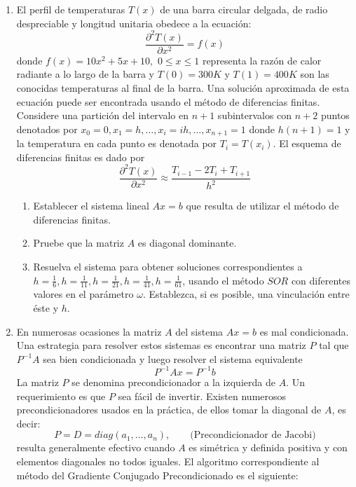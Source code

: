 \documentclass[12pt,letterpaper]{article}
\begin{document}
\begin{enumerate}
\item El perfil de temperaturas $T(x)$ de una barra circular delgada, de radio despreciable y longitud unitaria obedece
a la ecuaci\'on:
$$
\frac{\partial^2T(x)}{\partial x^2} = f(x)
$$
donde $f(x) = 10x^2 + 5x + 10,\,\, 0 \leq x \leq 1$ representa la raz\'on de calor radiante a lo largo de la barra y
$T(0) = 300K$ y $T(1) = 400K$ son las conocidas temperaturas al final de la barra. Una soluci\'on aproximada de esta
ecuaci\'on puede ser encontrada usando el m\'etodo de diferencias finitas. Considere una partici\'on del intervalo en $n
+ 1$ subintervalos con $n + 2$ puntos denotados por $x_0 = 0, x_1 = h, \ldots, x_i = ih, \ldots, x_{n+1} = 1$ donde
$h(n + 1) = 1$ y la temperatura en cada punto es denotada por $T_i = T(x_i)$. El esquema de diferencias finitas es dado
por
$$
\frac{\partial^2T(x)}{\partial x^2} \approx \frac{T_{i-1}-2T_i+T_{i+1}}{h^2}
$$
\begin{enumerate}
 \item Establecer el sistema lineal $Ax = b$ que resulta de utilizar el m\'etodo de diferencias finitas.
 \item Pruebe que la matriz $A$ es diagonal dominante.
 \item Resuelva el sistema para obtener soluciones correspondientes a $h =\frac{1}{6},h =\frac{1}{11},h =
\frac{1}{21}, h =\frac{1}{41},h =\frac{1}{61}$, usando el m\'etodo $SOR$ con diferentes valores en el par\'ametro
$\omega$. Establezca, si es posible, una vinculaci\'on entre \'este y $h$.
\end{enumerate}

\item En numerosas ocasiones la matriz $A$ del sistema $Ax = b$ es mal condicionada. Una estrategia para resolver
estos sistemas es encontrar una matriz $P$ tal que $P^{-1}A$ sea bien condicionada y luego resolver el sistema
equivalente
$$
P^{-1}Ax=P^{-1}b
$$
La matriz $P$ se denomina precondicionador a la izquierda de $A$. Un requerimiento es que $P$ sea f\'acil de invertir.
Existen numerosos precondicionadores usados en la pr\'actica, de ellos tomar la diagonal de $A$, es decir:
$$
P = D = diag(a_1 ,\ldots, a_n),\qquad \mbox{(Precondicionador de Jacobi)}
$$
resulta generalmente efectivo cuando $A$ es sim\'etrica y definida positiva y con elementos diagonales no todos
iguales. El algoritmo correspondiente al m\'etodo del Gradiente Conjugado Precondicionado es el siguiente:


\end{enumerate}
\end{document}
